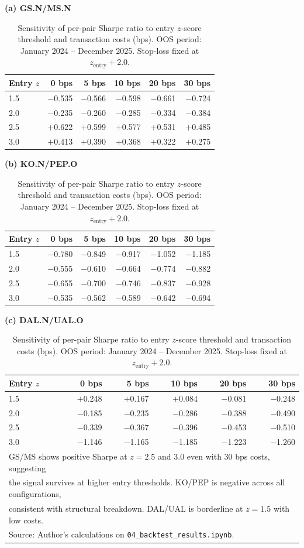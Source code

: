 \documentclass[a4paper]{report}
\begin{document}
\begin{table}[htbp]
\centering
\caption{Sensitivity of per-pair Sharpe ratio to entry $z$-score threshold and transaction
costs (bps). OOS period: January 2024 -- December 2025. Stop-loss fixed at $z_{\text{entry}} + 2.0$.}
\label{tab:sensitivity}

\medskip
\textbf{(a) GS.N/MS.N}

\smallskip
\begin{tabular}{lrrrrr}
\toprule
Entry $z$ & 0 bps & 5 bps & 10 bps & 20 bps & 30 bps \\
\midrule
1.5 & $-$0.535 & $-$0.566 & $-$0.598 & $-$0.661 & $-$0.724 \\
2.0 & $-$0.235 & $-$0.260 & $-$0.285 & $-$0.334 & $-$0.384 \\
2.5 & $+$0.622 & $+$0.599 & $+$0.577 & $+$0.531 & $+$0.485 \\
3.0 & $+$0.413 & $+$0.390 & $+$0.368 & $+$0.322 & $+$0.275 \\
\bottomrule
\end{tabular}

\medskip
\textbf{(b) KO.N/PEP.O}

\smallskip
\begin{tabular}{lrrrrr}
\toprule
Entry $z$ & 0 bps & 5 bps & 10 bps & 20 bps & 30 bps \\
\midrule
1.5 & $-$0.780 & $-$0.849 & $-$0.917 & $-$1.052 & $-$1.185 \\
2.0 & $-$0.555 & $-$0.610 & $-$0.664 & $-$0.774 & $-$0.882 \\
2.5 & $-$0.655 & $-$0.700 & $-$0.746 & $-$0.837 & $-$0.928 \\
3.0 & $-$0.535 & $-$0.562 & $-$0.589 & $-$0.642 & $-$0.694 \\
\bottomrule
\end{tabular}

\medskip
\textbf{(c) DAL.N/UAL.O}

\smallskip
\begin{tabular}{lrrrrr}
\toprule
Entry $z$ & 0 bps & 5 bps & 10 bps & 20 bps & 30 bps \\
\midrule
1.5 & $+$0.248 & $+$0.167 & $+$0.084 & $-$0.081 & $-$0.248 \\
2.0 & $-$0.185 & $-$0.235 & $-$0.286 & $-$0.388 & $-$0.490 \\
2.5 & $-$0.339 & $-$0.367 & $-$0.396 & $-$0.453 & $-$0.510 \\
3.0 & $-$1.146 & $-$1.165 & $-$1.185 & $-$1.223 & $-$1.260 \\
\bottomrule
\multicolumn{6}{l}{\small GS/MS shows positive Sharpe at $z = 2.5$ and $3.0$ even with 30 bps costs, suggesting} \\
\multicolumn{6}{l}{\small the signal survives at higher entry thresholds. KO/PEP is negative across all configurations,} \\
\multicolumn{6}{l}{\small consistent with structural breakdown. DAL/UAL is borderline at $z = 1.5$ with low costs.} \\
\multicolumn{6}{l}{\small Source: Author's calculations on \texttt{04\_backtest\_results.ipynb}.}
\end{tabular}
\end{table}
\end{document}
